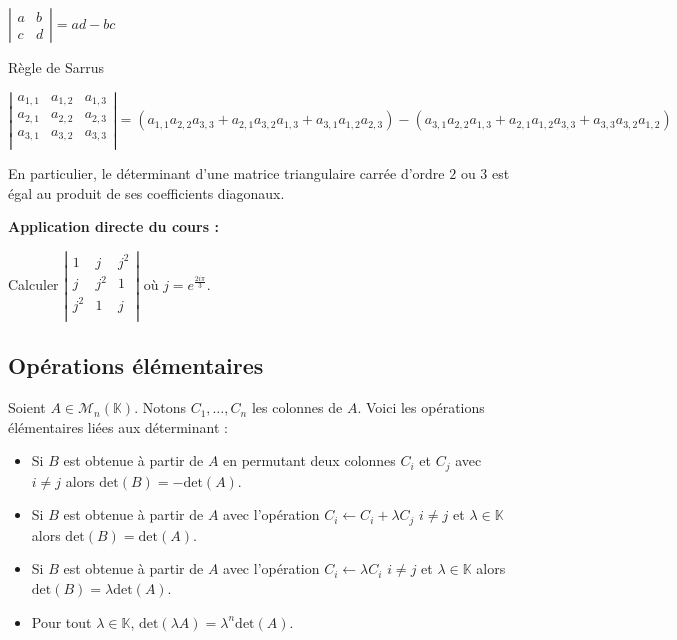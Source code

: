 \documentclass[french,11pt,twoside]{VcCours}
\newenvironment{ApplicationDirecte}{\textbf{Application directe du cours :}

}{}
\begin{document}
\begin{Proposition}{} $\left\vert \begin{array}{cc}
a & b \\
c & d
\end{array} \right\vert = ad-bc$
\end{Proposition}

\begin{Proposition}{Règle de Sarrus}

$$\left\vert \begin{array}{ccc}
a_{1,1} & a_{1,2} & a_{1,3} \\
a_{2,1} & a_{2,2} & a_{2,3} \\
a_{3,1} & a_{3,2} & a_{3,3} \\
\end{array} \right\vert =  (a_{1,1}a_{2,2} a_{3,3} +  a_{2,1}a_{3,2}a_{1,3} + a_{3,1}a_{1,2}a_{2,3}) - (a_{3,1}a_{2,2}a_{1,3} + a_{2,1} a_{1,2} a_{3,3} + a_{3,3} a_{3,2} a_{1,2} ) $$
\end{Proposition}

\begin{Remarque}{} En particulier, le déterminant d'une matrice triangulaire carrée d'ordre $2$ ou $3$ est égal au produit de ses coefficients diagonaux.
\end{Remarque}

\begin{ApplicationDirecte} Calculer $\left\vert \begin{array}{ccc}
1 & j & j^2 \\
j & j^2& 1 \\
j^2 & 1 & j \\
\end{array}\right\vert$ où $j=e^{\frac{2i\pi}{3}}$.
\end{ApplicationDirecte}

\subsection{Opérations élémentaires}

Soient $A \in \mathcal{M}_n(\mathbb{K})$. Notons $C_1, \ldots, C_n$ les colonnes de $A$. Voici les opérations élémentaires liées aux déterminant :

\begin{itemize}
\item Si $B$ est obtenue à partir de $A$ en permutant deux colonnes $C_i$ et $C_j$ avec $i \neq j$ alors $\textrm{det}(B) = - \textrm{det}(A)$.
\item Si $B$ est obtenue à partir de $A$ avec l'opération $C_i \leftarrow C_i + \lambda C_j$ $i \neq j$ et $\lambda \in \mathbb{K}$ alors $\textrm{det}(B) = \textrm{det}(A)$.
\item Si $B$ est obtenue à partir de $A$ avec l'opération $C_i \leftarrow \lambda C_i$ $i \neq j$ et $\lambda \in \mathbb{K}$ alors $\textrm{det}(B) = \lambda\textrm{det}(A)$.
\item Pour tout $\lambda \in \mathbb{K}$, $\textrm{det}(\lambda A) = \lambda^n \textrm{det}(A)$.
\end{itemize}
\end{document}
